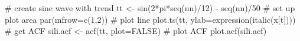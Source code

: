 \begin{Schunk}
\begin{Sinput}
 # create sine wave with trend
 tt <- sin(2*pi*seq(nn)/12) - seq(nn)/50
 # set up plot area
 par(mfrow=c(1,2))
 # plot line
 plot.ts(tt, ylab=expression(italic(x[t])))
 # get ACF
 sili.acf <- acf(tt, plot=FALSE)
 # plot ACF
 plot.acf(sili.acf)
\end{Sinput}
\end{Schunk}
